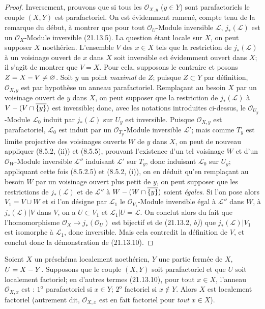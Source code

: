 \begin{proof}
Inversement, prouvons que si tous les $\mathcal O_{X,y}$ ($y\in Y$) sont
parafactoriels le couple $(X,Y)$ est parafactoriel. On est évidemment ramené, compte
tenu de la remarque du début, à montrer que pour tout $\mathcal O_U$-Module inversible
$\mathscr L$, $j_*(\mathscr L)$ est un $\mathcal O_X$-Module inversible (21.13.5).
La question étant locale sur $X$, on peut supposer $X$ noethérien. L'ensemble $V$ des
$x\in X$ tels que la restriction de $j_*(\mathscr L)$ à un voisinage ouvert de $x$
dans $X$ soit inversible est évidemment ouvert dans $X$; il s'agit de montrer que
$V=X$. Pour cela, supposons le contraire et posons $Z=X- V\neq\varnothing$. Soit $y$
un point \emph{maximal} de $Z$; puisque $Z\subset Y$ par définition,
$\mathcal O_{X,y}$ est par hypothèse un anneau parafactoriel. Remplaçant au besoin
$X$ par un voisinage ouvert de $y$ dans $X$, on peut supposer que la restriction de
$j_*(\mathscr L)$
à $V-(V\cap\overline{\{y\}})$ est inversible; donc, avec les notations introduites
ci-dessus, le $\mathcal O_{U_y}$-Module $\mathscr L_0$ induit par $j_*(\mathscr L)$
sur $U_y$ est inversible. Puisque $\mathcal O_{X,y}$ est parafactoriel,
$\mathscr L_0$ est induit par un $\mathcal O_{T_y}$-Module inversible $\mathscr L'$;
mais comme $T_y$ est limite projective des voisinages ouverts $W$ de $y$ dans $X$,
on peut de nouveau appliquer (8.5.2, (ii)) et (8.5.5), prouvant l'existence d'un tel
voisinage $W$ et d'un $\mathcal O_W$-Module inversible $\mathscr L''$ induisant
$\mathscr L'$ sur $T_y$, donc induisant $\mathscr L_0$ sur $U_y$; appliquant cette
fois (8.5.2.5) et (8.5.2, (i)), on en déduit qu'en remplaçant au besoin $W$ par un
voisinage ouvert plus petit de $y$, on peut supposer que les restrictions de
$j_*(\mathscr L)$ et de $\mathscr L''$ à
$W-(W\cap\overline{\{y\}})$ soient \emph{égales}. Si l'on pose alors $V_1=V\cup W$ et si
l'on désigne par $\mathscr L_1$ le $\mathcal O_{V_1}$-Module inversible égal à
$\mathscr L''$ dans $W$, à $j_*(\mathscr L)|V$ dans $V$, on a $U\subset V_1$ et
$\mathscr L_1|U=\mathscr L$. On conclut alors du fait que l'homomorphisme
$\mathcal O_X\to j_*(\mathcal O_U)$ est bijectif et de (21.13.2, \emph{b)}) que
$j_*(\mathscr L)|V_1$ est isomorphe à $\mathscr L_1$, donc inversible. Mais cela
contredit la définition de $V$, et conclut donc la démonstration de (21.13.10).
\end{proof}

\begin{corollary}[21.13.11]
\label{IV.21.13.11}
Soient $X$ un préschéma localement noethérien, $Y$ une partie fermée de $X$,
$U=X- Y$. Supposons que le couple $(X,Y)$ soit parafactoriel et que $U$ soit
localement factoriel; en d'autres termes \textup{(21.13.10)}, pour tout $x\in X$, l'anneau
$\mathcal O_{X,x}$ est : $1^{\mathrm o}$ parafactoriel si $x\in Y$;
$2^{\mathrm o}$ factoriel si $x\notin Y$. Alors $X$ est localement factoriel
\textup{(autrement dit, $\mathcal O_{X,x}$ est en fait factoriel pour \emph{tout} $x\in X$)}.
\end{corollary}


